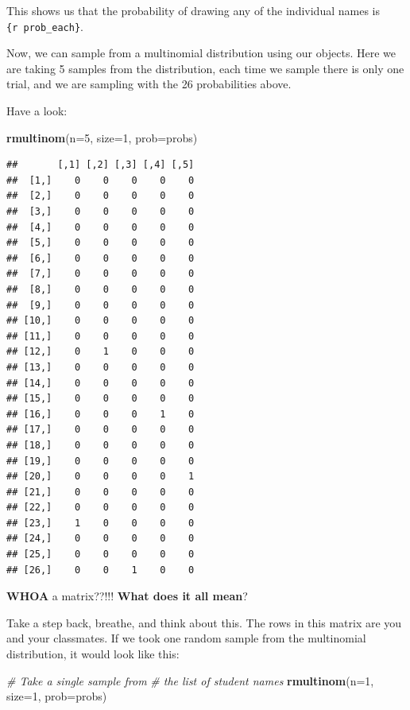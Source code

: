 \documentclass[
]{book}
\newenvironment{Shaded}{\begin{snugshade}}{\end{snugshade}}
\newcommand{\CommentTok}[1]{\textcolor[rgb]{0.56,0.35,0.01}{\textit{#1}}}
\newcommand{\DataTypeTok}[1]{\textcolor[rgb]{0.13,0.29,0.53}{#1}}
\newcommand{\DecValTok}[1]{\textcolor[rgb]{0.00,0.00,0.81}{#1}}
\newcommand{\KeywordTok}[1]{\textcolor[rgb]{0.13,0.29,0.53}{\textbf{#1}}}
\newcommand{\NormalTok}[1]{#1}
\begin{document}
This shows us that the probability of drawing any of the individual names is \texttt{\{r\ prob\_each\}}.

Now, we can sample from a multinomial distribution using our objects. Here we are taking 5 samples from the distribution, each time we sample there is only one trial, and we are sampling with the 26 probabilities above.

Have a look:

\begin{Shaded}
\begin{Highlighting}[]
\KeywordTok{rmultinom}\NormalTok{(}\DataTypeTok{n=}\DecValTok{5}\NormalTok{, }\DataTypeTok{size=}\DecValTok{1}\NormalTok{, }\DataTypeTok{prob=}\NormalTok{probs)}
\end{Highlighting}
\end{Shaded}

\begin{verbatim}
##       [,1] [,2] [,3] [,4] [,5]
##  [1,]    0    0    0    0    0
##  [2,]    0    0    0    0    0
##  [3,]    0    0    0    0    0
##  [4,]    0    0    0    0    0
##  [5,]    0    0    0    0    0
##  [6,]    0    0    0    0    0
##  [7,]    0    0    0    0    0
##  [8,]    0    0    0    0    0
##  [9,]    0    0    0    0    0
## [10,]    0    0    0    0    0
## [11,]    0    0    0    0    0
## [12,]    0    1    0    0    0
## [13,]    0    0    0    0    0
## [14,]    0    0    0    0    0
## [15,]    0    0    0    0    0
## [16,]    0    0    0    1    0
## [17,]    0    0    0    0    0
## [18,]    0    0    0    0    0
## [19,]    0    0    0    0    0
## [20,]    0    0    0    0    1
## [21,]    0    0    0    0    0
## [22,]    0    0    0    0    0
## [23,]    1    0    0    0    0
## [24,]    0    0    0    0    0
## [25,]    0    0    0    0    0
## [26,]    0    0    1    0    0
\end{verbatim}

\textbf{WHOA} a matrix??!!! \textbf{What does it all mean}?

Take a step back, breathe, and think about this. The rows in this matrix are you and your classmates. If we took one random sample from the multinomial distribution, it would look like this:

\begin{Shaded}
\begin{Highlighting}[]
\CommentTok{# Take a single sample from}
\CommentTok{# the list of student names    }
\KeywordTok{rmultinom}\NormalTok{(}\DataTypeTok{n=}\DecValTok{1}\NormalTok{, }\DataTypeTok{size=}\DecValTok{1}\NormalTok{, }\DataTypeTok{prob=}\NormalTok{probs)}
\end{Highlighting}
\end{Shaded}
\end{document}
